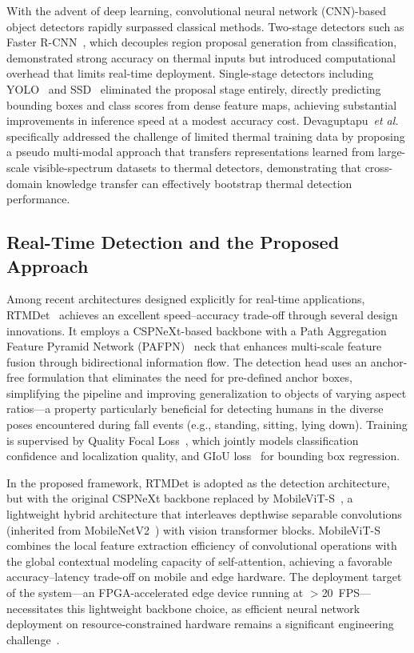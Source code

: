 With the advent of deep learning, convolutional neural network (CNN)-based object detectors rapidly surpassed classical methods. Two-stage detectors such as Faster R-CNN~\cite{ren2015faster}, which decouples region proposal generation from classification, demonstrated strong accuracy on thermal inputs but introduced computational overhead that limits real-time deployment. Single-stage detectors including YOLO~\cite{redmon2016yolo} and SSD~\cite{liu2016ssd} eliminated the proposal stage entirely, directly predicting bounding boxes and class scores from dense feature maps, achieving substantial improvements in inference speed at a modest accuracy cost. Devaguptapu~\emph{et al.}~\cite{devaguptapu2019borrow} specifically addressed the challenge of limited thermal training data by proposing a pseudo multi-modal approach that transfers representations learned from large-scale visible-spectrum datasets to thermal detectors, demonstrating that cross-domain knowledge transfer can effectively bootstrap thermal detection performance.

\subsection*{Real-Time Detection and the Proposed Approach}

Among recent architectures designed explicitly for real-time applications, RTMDet~\cite{lyu2022rtmdet} achieves an excellent speed--accuracy trade-off through several design innovations. It employs a CSPNeXt-based backbone with a Path Aggregation Feature Pyramid Network (PAFPN)~\cite{liu2018path} neck that enhances multi-scale feature fusion through bidirectional information flow. The detection head uses an anchor-free formulation that eliminates the need for pre-defined anchor boxes, simplifying the pipeline and improving generalization to objects of varying aspect ratios---a property particularly beneficial for detecting humans in the diverse poses encountered during fall events (e.g., standing, sitting, lying down). Training is supervised by Quality Focal Loss~\cite{li2020generalized}, which jointly models classification confidence and localization quality, and GIoU loss~\cite{rezatofighi2019generalized} for bounding box regression.

In the proposed framework, RTMDet is adopted as the detection architecture, but with the original CSPNeXt backbone replaced by MobileViT-S~\cite{mehta2022mobilevit}, a lightweight hybrid architecture that interleaves depthwise separable convolutions (inherited from MobileNetV2~\cite{sandler2018mobilenetv2}) with vision transformer blocks. MobileViT-S combines the local feature extraction efficiency of convolutional operations with the global contextual modeling capacity of self-attention, achieving a favorable accuracy--latency trade-off on mobile and edge hardware. The deployment target of the system---an FPGA-accelerated edge device running at $>$20~FPS---necessitates this lightweight backbone choice, as efficient neural network deployment on resource-constrained hardware remains a significant engineering challenge~\cite{sze2017efficient}.


